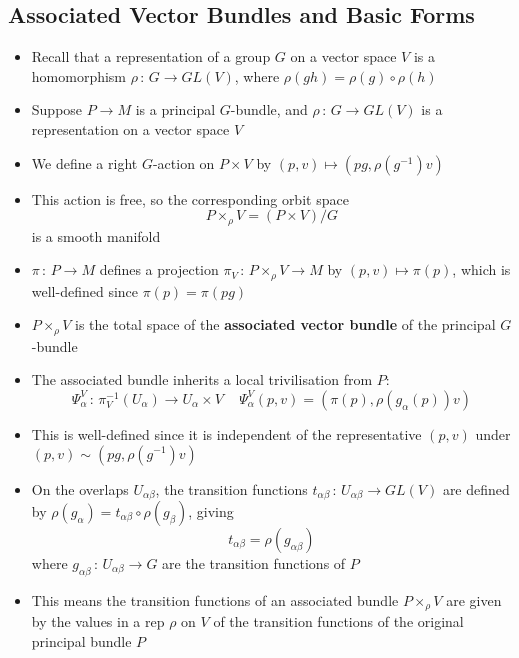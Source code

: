 \documentclass[12pt,a4paper]{article}
\numberwithin{equation}{section}
\begin{document}
	\subsection{Associated Vector Bundles and Basic Forms}
	\begin{itemize}
		\item Recall that a representation of a group $G$ on a vector space $V$ is a homomorphism $\rho\,:\,G\to GL(V)$, where $\rho(gh)=\rho(g)\circ\rho(h)$
		\item Suppose $P\to M$ is a principal $G$-bundle, and $\rho\,:\,G\to GL(V)$ is a representation on a vector space $V$
		\item We define a right $G$-action on $P\times V$ by $(p,v)\mapsto (pg,\rho(g^{-1})v)$
		\item This action is free, so the corresponding orbit space
		\begin{equation}
			P\times_{\rho}V=(P\times V)/G
		\end{equation}
		is a smooth manifold
		\item $\pi\,:\,P\to M$ defines a projection $\pi_{V}\,:\,P\times_{\rho}V\to M$ by $(p,v)\mapsto \pi(p)$, which is well-defined since $\pi(p)=\pi(pg)$
		\item $P\times_{\rho}V$ is the total space of the \textbf{associated vector bundle} of the principal $G$-bundle
		\item The associated bundle inherits a local trivilisation from $P$:
		\begin{equation}
			\Psi_{\alpha}^{V}\,:\,\pi_{V}^{-1}(U_{\alpha})\to U_{\alpha}\times V\,\quad\Psi_{\alpha}^{V}(p,v)=(\pi(p),\rho(g_{\alpha}(p))v)
		\end{equation}
		\item This is well-defined since it is independent of the representative $(p,v)$ under $(p,v)\sim(pg,\rho(g^{-1})v)$ 
		\item On the overlaps $U_{\alpha\beta}$, the transition functions $t_{\alpha\beta}\,:\,U_{\alpha\beta}\to GL(V)$ are defined by $\rho(g_{\alpha})=t_{\alpha\beta}\circ\rho(g_{\beta})$, giving 
		\begin{equation}
			t_{\alpha\beta}=\rho(g_{\alpha\beta})
		\end{equation}
		where $g_{\alpha\beta}\,:\,U_{\alpha\beta}\to G$ are the transition functions of $P$
		\item This means the transition functions of an associated bundle $P\times_{\rho}V$ are given by the values in a rep $\rho$ on $V$ of the transition functions of the original principal bundle $P$

\end{itemize}
\end{document}
